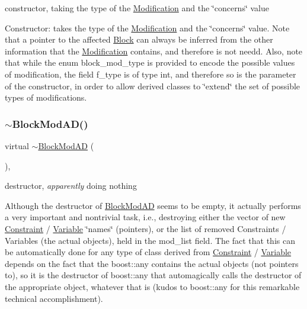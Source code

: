 constructor, taking the type of the \mbox{\hyperlink{class_s_m_spp__di__unipi__it_1_1_modification}{Modification}} and the \char`\"{}concerns\char`\"{} value 

Constructor\+: takes the type of the \mbox{\hyperlink{class_s_m_spp__di__unipi__it_1_1_modification}{Modification}} and the \char`\"{}concerns\char`\"{} value. Note that a pointer to the affected \mbox{\hyperlink{class_s_m_spp__di__unipi__it_1_1_block}{Block}} can always be inferred from the other information that the \mbox{\hyperlink{class_s_m_spp__di__unipi__it_1_1_modification}{Modification}} contains, and therefore is not needd. Also, note that while the enum block\+\_\+mod\+\_\+type is provided to encode the possible values of modification, the field f\+\_\+type is of type int, and therefore so is the parameter of the constructor, in order to allow derived classes to \char`\"{}extend\char`\"{} the set of possible types of modifications. \mbox{\label{class_s_m_spp__di__unipi__it_1_1_block_mod_a_d_aaa3a21020e492301264144046ae407ba}} 
\subsubsection{\texorpdfstring{$\sim$\+Block\+Mod\+A\+D()}{~BlockModAD()}}
{\footnotesize\ttfamily virtual $\sim$\mbox{\hyperlink{class_s_m_spp__di__unipi__it_1_1_block_mod_a_d}{Block\+Mod\+AD}} (\begin{DoxyParamCaption}{ }\end{DoxyParamCaption})\hspace{0.3cm}{\ttfamily [inline]}, {\ttfamily [virtual]}}



destructor, {\itshape apparently} doing nothing 

Although the destructor of \mbox{\hyperlink{class_s_m_spp__di__unipi__it_1_1_block_mod_a_d}{Block\+Mod\+AD}} seems to be empty, it actually performs a very important and nontrivial task, i.\+e., destroying either the vector of new \mbox{\hyperlink{class_s_m_spp__di__unipi__it_1_1_constraint}{Constraint}} / \mbox{\hyperlink{class_s_m_spp__di__unipi__it_1_1_variable}{Variable}} \char`\"{}names\char`\"{} (pointers), or the list of removed Constraints / Variables (the actual objects), held in the mod\+\_\+list field. The fact that this can be automatically done for any type of class derived from \mbox{\hyperlink{class_s_m_spp__di__unipi__it_1_1_constraint}{Constraint}} / \mbox{\hyperlink{class_s_m_spp__di__unipi__it_1_1_variable}{Variable}} depends on the fact that the boost\+::any contains the actual objects (not pointers to), so it is the destructor of boost\+::any that automagically calls the destructor of the appropriate object, whatever that is (kudos to boost\+::any for this remarkable technical accomplishment). 

